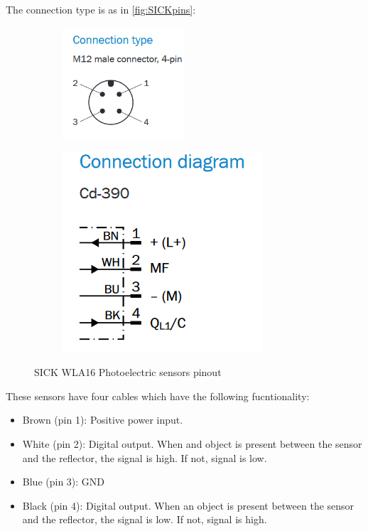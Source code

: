 \documentclass[a4paper]{article}
\begin{document}
The connection type is as in \autoref{fig:SICKpins}:

\begin{figure}[h!]
	\begin{subfigure}{.5\textwidth}
		\centering
		\includegraphics[width=0.5\textwidth]{SICKpins1.png}
		\label{fig:SICKpins2}
	\end{subfigure}%
	\begin{subfigure}{.5\textwidth}
		\centering
		\includegraphics[width=.5\linewidth]{SICKpins2.png}
		\label{fig:SICKpins2}
	\end{subfigure}
	\caption{SICK WLA16 Photoelectric sensors pinout}
	\label{fig:SICKpins}
\end{figure} 

These sensors have four cables which have the following fucntionality:
\begin{itemize}
	\item Brown (pin 1): Positive power input.
	\item White (pin 2): Digital output. When and object is present between the sensor and the reflector, the signal is high. If not, signal is low.
	\item Blue (pin 3): GND 	
	\item Black (pin 4): Digital output. When an object is present between the sensor and the reflector, the signal is low. If not, signal is high.
\end{itemize}
\end{document}
